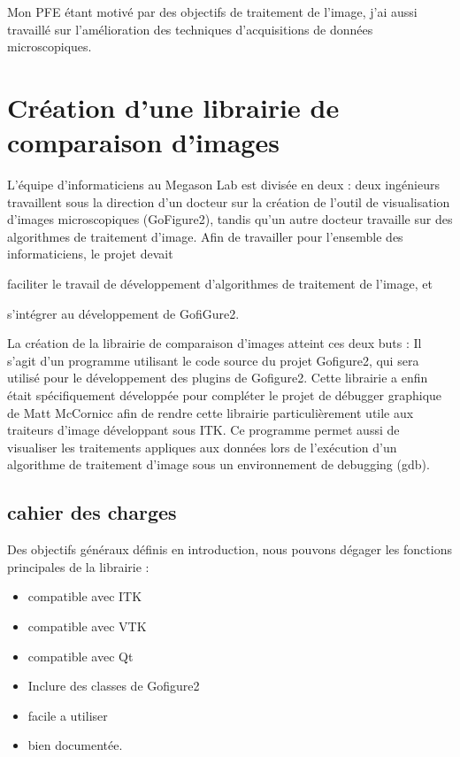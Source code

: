 Mon PFE étant motivé par des objectifs de traitement de l'image, j'ai aussi travaillé sur l'amélioration
 des techniques d'acquisitions de données microscopiques.







\section{Création d'une librairie de comparaison d'images}

L'équipe d'informaticiens au Megason Lab est divisée en deux : deux ingénieurs travaillent sous la direction d'un docteur sur la
 création de l'outil de visualisation d'images microscopiques (GoFigure2), tandis qu'un autre docteur travaille sur
 des algorithmes de traitement d'image. Afin de travailler pour l'ensemble des informaticiens, le projet devait
\begin{inparaenum}[(i)]
  \item faciliter le travail de développement d'algorithmes de traitement de l'image, et 
  \item s'intégrer au développement de GofiGure2.
\end{inparaenum}

La création de la librairie de comparaison d'images atteint ces deux buts : Il s'agit d'un programme utilisant le code source du projet Gofigure2, qui sera utilisé pour le développement des plugins de Gofigure2.
Cette librairie a enfin était spécifiquement développée pour compléter le projet de débugger graphique de Matt McCornicc afin de rendre cette librairie particulièrement utile aux traiteurs d'image développant sous ITK. Ce programme permet aussi de visualiser les traitements appliques aux données lors de l'exécution d'un algorithme de traitement d'image sous un environnement de debugging (gdb).


\subsection{cahier des charges}

Des objectifs généraux définis en introduction, nous pouvons dégager les fonctions principales de la librairie :
\begin{itemize}
  \item compatible avec ITK
  \item compatible avec VTK
  \item compatible avec Qt
  \item Inclure des classes de Gofigure2
  \item facile a utiliser
  \item bien documentée.
\end{itemize}


